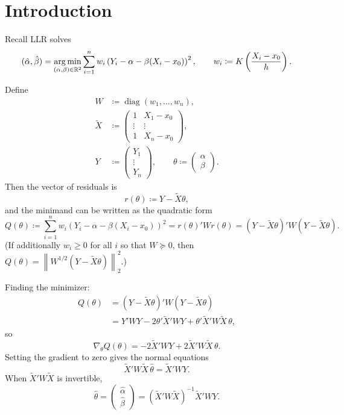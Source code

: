 
\section{Introduction}



Recall LLR solves
\[
(\hat{\alpha},\hat{\beta})
= \operatorname*{arg\,min}_{(\alpha,\beta)\in\mathbb{R}^2} \sum\limits_{i=1}^{n} w_i \left( Y_i - \alpha - \beta(X_i-x_0) \right)^2,
\qquad
w_i \coloneqq K\left(\frac{X_i-x_0}{h}\right).
\]

Define
\[
\begin{aligned}
	W &\coloneqq \operatorname{diag}(w_1,\ldots,w_n), \\
	\tilde{X} &\coloneqq
	\begin{pmatrix}
		1 & X_1-x_0 \\
		\vdots & \vdots \\
		1 & X_n-x_0
	\end{pmatrix}, \\
	Y &\coloneqq
	\begin{pmatrix}
		Y_1\\ \vdots\\ Y_n
	\end{pmatrix},
	\qquad
	\theta \coloneqq
	\begin{pmatrix}
		\alpha\\ \beta
	\end{pmatrix}.
\end{aligned}
\]
Then the vector of residuals is
\[
r(\theta) \coloneqq Y - \tilde{X}\theta,
\]
and the minimand can be written as the quadratic form
\[
Q(\theta)
\coloneqq \sum\limits_{i=1}^{n} w_i \left( Y_i - \alpha - \beta(X_i-x_0) \right)^2
= r(\theta)'W r(\theta)
= (Y-\tilde{X}\theta)'W(Y-\tilde{X}\theta).
\]
(If additionally $w_i\ge 0$ for all $i$ so that $W\succeq 0$, then $Q(\theta)=\left\|W^{1/2}(Y-\tilde{X}\theta)\right\|_2^2$.)

Finding the minimizer:
\begin{align*}
Q(\theta)
&= (Y-\tilde{X}\theta)'W(Y-\tilde{X}\theta) \\
&= Y'WY - 2\theta'\tilde{X}'WY + \theta'\tilde{X}'W\tilde{X}\,\theta,
\end{align*}
so
\[
\nabla_{\theta} Q(\theta)
= -2\tilde{X}'WY + 2\tilde{X}'W\tilde{X}\,\theta.
\]
Setting the gradient to zero gives the normal equations
\[
\tilde{X}'W\tilde{X}\,\hat{\theta} = \tilde{X}'WY.
\]
When $\tilde{X}'W\tilde{X}$ is invertible,
\[
\hat{\theta}
=
\begin{pmatrix}
\hat{\alpha}\\ \hat{\beta}
\end{pmatrix}
= (\tilde{X}'W\tilde{X})^{-1}\tilde{X}'WY.
\]

